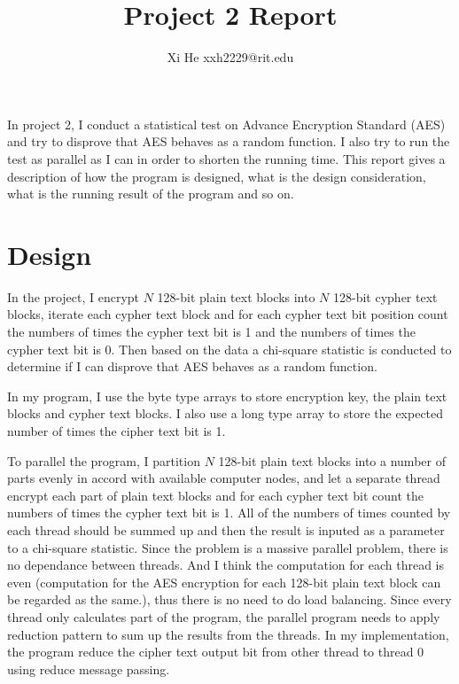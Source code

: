 \documentclass[12pt]{article}
\begin{document}
\title{Project 2 Report}
\author{Xi He xxh2229@rit.edu}

\maketitle


In project 2, I conduct a statistical test on Advance Encryption Standard (AES) and try to disprove that AES behaves as a random function.  I also try to run the test as parallel as I can in order to shorten the running time. This report gives a description of how the program is designed, what is the design consideration, what is the running result of the program and so on.  
\section{Design}
In the project, I encrypt $N$ 128-bit plain text blocks into $N$ 128-bit cypher text blocks, iterate each cypher text block and for each cypher text bit position count the numbers of times the cypher text bit is 1 and the numbers of times the cypher text bit is 0. Then based on the data a chi-square statistic is conducted to determine if I can disprove that AES behaves as a random function. 

In my program, I use the byte type arrays to store encryption key, the plain text blocks and cypher text blocks. I also use a long type array to store the expected number of times the cipher text bit is 1.   

To parallel the program, I partition $N$ 128-bit plain text blocks into a number of parts evenly in accord with available computer nodes, and let a separate thread encrypt each part of plain text blocks and for each cypher text bit count the numbers of times the cypher text bit is 1. All of the numbers of times counted by each thread should be summed up and then the result is inputed as a parameter to a chi-square statistic. Since the problem is a massive parallel problem, there is no dependance between threads. And I think the computation for each thread is even (computation for the AES encryption for each 128-bit plain text block can be regarded as the same.), thus there is no need to do load balancing. Since every thread only calculates part of the program, the parallel program needs to apply reduction pattern to sum up the results from the threads. In my implementation, the program reduce the cipher text output bit from other thread to thread 0 using reduce message passing. 
\end{document}
